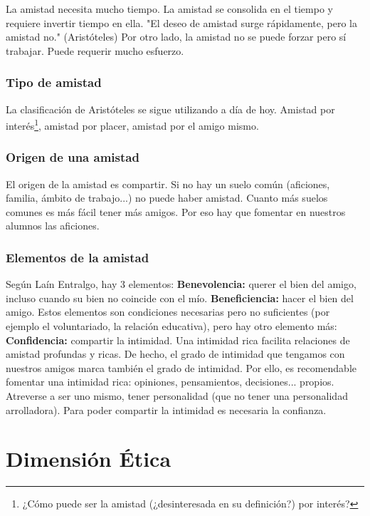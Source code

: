 \documentclass[palatino]{apuntesURJC}
\begin{document}
La amistad necesita mucho tiempo.
%
La amistad se consolida en el tiempo y requiere invertir tiempo en ella. 
%
"El deseo de amistad surge rápidamente, pero la amistad no." (Aristóteles)
%
Por otro lado,
%
la amistad no se puede forzar pero sí trabajar. 
%
Puede requerir mucho esfuerzo.


\subsubsection{Tipo de amistad}

La clasificación de Aristóteles se sigue utilizando a día de hoy.
%
Amistad por interés\footnote{¿Cómo puede ser la amistad (¿desinteresada en su definición?) por interés?}, amistad por placer, amistad por el amigo mismo.


\subsubsection{Origen de una amistad}

El origen de la amistad es compartir. 
%
Si no hay un suelo común (aficiones, familia, ámbito de trabajo...) no puede haber amistad.
%
Cuanto más suelos comunes es más fácil tener más amigos.
%
Por eso hay que fomentar en nuestros alumnos las aficiones.

\subsubsection{Elementos de la amistad}

Según Laín Entralgo, hay 3 elementos:
%
\textbf{Benevolencia:} querer el bien del amigo, incluso cuando su bien no coincide con el mío.
%
\textbf{Beneficiencia:} hacer el bien del amigo.
%
Estos elementos son condiciones necesarias pero no suficientes (por ejemplo el voluntariado, la relación educativa), pero hay otro elemento más:
%
\textbf{Confidencia:} compartir la intimidad. 
%
Una intimidad rica facilita relaciones de amistad profundas y ricas.
%
De hecho, el grado de intimidad que tengamos con nuestros amigos marca también el grado de intimidad. 
%
Por ello, es recomendable fomentar una intimidad rica: opiniones, pensamientos, decisiones... propios.
%
Atreverse a ser uno mismo, tener personalidad (que no tener una personalidad arrolladora).
%
Para poder compartir la intimidad es necesaria la confianza.



\section{Dimensión Ética}
\end{document}
